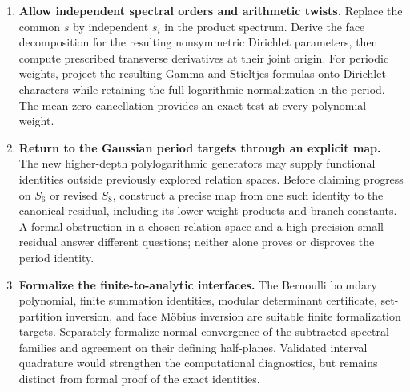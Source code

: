 \begin{enumerate}[label=\textbf{R\arabic*.}]
\item \textbf{Allow independent spectral orders and arithmetic twists.}
Replace the common $s$ by independent $s_i$ in the product spectrum.
Derive the face decomposition for the resulting nonsymmetric Dirichlet
parameters, then compute prescribed transverse derivatives at their
joint origin. For periodic weights, project the resulting Gamma and
Stieltjes formulas onto Dirichlet characters while retaining the full
logarithmic normalization in the period. The mean-zero cancellation
provides an exact test at every polynomial weight.

\item \textbf{Return to the Gaussian period targets through an explicit
map.}
The new higher-depth polylogarithmic generators may supply functional
identities outside previously explored relation spaces. Before claiming
progress on $S_6$ or revised $S_8$, construct a precise map from one
such identity to the canonical residual, including its lower-weight
products and branch constants. A formal obstruction in a chosen
relation space and a high-precision small residual answer different
questions; neither alone proves or disproves the period identity.

\item \textbf{Formalize the finite-to-analytic interfaces.}
The Bernoulli boundary polynomial, finite summation identities,
modular determinant certificate, set-partition inversion, and face
M\"obius inversion are suitable finite formalization targets.
Separately formalize normal convergence of the subtracted spectral
families and agreement on their defining half-planes. Validated
interval quadrature would strengthen the computational diagnostics,
but remains distinct from formal proof of the exact identities.
\end{enumerate}
